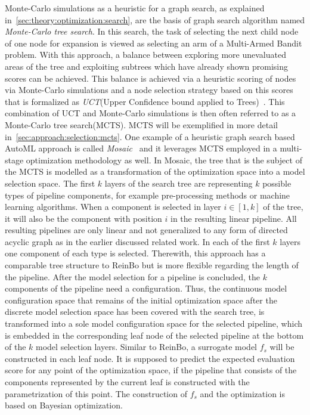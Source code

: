 Monte-Carlo simulations as a heuristic for a graph search, as explained in~\ref{sec:theory:optimization:search}, are the basis of graph search algorithm named \textit{Monte-Carlo tree search}.
In this search, the task of selecting the next child node of one node for expansion is viewed as selecting an arm of a Multi-Armed Bandit problem.
With this approach, a balance between exploring more unevaluated areas of the tree and exploiting subtrees which have already shown promising scores can be achieved.
This balance is achieved via a heuristic scoring of nodes via Monte-Carlo simulations and a node selection strategy based on this scores that is formalized as \textit{UCT}(Upper Confidence bound applied to Trees)~\cite{Kocsis-UCT}.
This combination of UCT and Monte-Carlo simulations is then often referred to as a Monte-Carlo tree search(MCTS).
MCTS will be exemplified in more detail in~\ref{sec:approach:selection:mcts}.\newline
One example of a heuristic graph search based AutoML approach is called \textit{Mosaic}~\cite{Rakotoarison-Mosaic} and it leverages MCTS employed in a multi-stage optimization methodology as well.
In Mosaic, the tree that is the subject of the MCTS is modelled as a transformation of the optimization space into a model selection space.
The first $k$ layers of the search tree are representing $k$ possible types of pipeline components, for example pre-processing methods or machine learning algorithms.
When a component is selected in layer $i \in [1,k]$ of the tree, it will also be the component with position $i$ in the resulting linear pipeline.
All resulting pipelines are only linear and not generalized to any form of directed acyclic graph as in the earlier discussed related work.
In each of the first $k$ layers one component of each type is selected.
Therewith, this approach has a comparable tree structure to ReinBo but is more flexible regarding the length of the pipeline.\newline
After the model selection for a pipeline is concluded, the $k$ components of the pipeline need a configuration.
Thus, the continuous model configuration space that remains of the initial optimization space after the discrete model selection space has been covered with the search tree, is transformed into a sole model configuration space for the selected pipeline, which is embedded in the corresponding leaf node of the selected pipeline at the bottom of the $k$ model selection layers.
Similar to ReinBo, a surrogate model $f_s$ will be constructed in each leaf node.
It is supposed to predict the expected evaluation score for any point of the optimization space, if the pipeline that consists of the components represented by the current leaf is constructed with the parametrization of this point.
The construction of $f_s$ and the optimization is based on Bayesian optimization.


